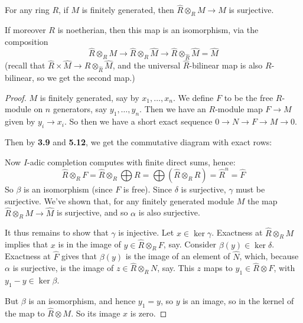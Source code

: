\documentclass[10pt,a4paper]{article}
\begin{document}
\begin{proposition}
  For any ring $R$, if $M$ is finitely generated, then $\hat{R}\otimes_R M \to \hat{M}$ is surjective.

  If moreover $R$ is noetherian, then this map is an isomorphism, via the composition
  \[\hat{R}\otimes_R M \to \hat{R}\otimes_R\hat{M} \to \hat{R}\otimes_{\hat{R}} \hat{M} = \hat{M}\]
  (recall that $\hat{R} \times \hat{M} \to \hat{R}\otimes_{\hat{R}}\hat{M}$, and the universal $\hat{R}$-bilinear map is also $R$-bilinear, so we get the second map.)
\end{proposition}
\begin{proof}
  $M$ is finitely generated, say by $x_1, \ldots, x_n$. We define $F$ to be the free $R$-module on $n$ generators, say $y_1, \ldots, y_n$. Then we have an $R$-module map $F \to M$ given by $y_i \to x_i$. So then we have a short exact sequence $0 \to N \to F \to M \to 0$.

  Then by \textbf{3.9} and \textbf{5.12}, we get the commutative diagram with exact rows:
  \begin{center}
  \end{center}
  Now $I$-adic completion computes with finite direct sums, hence:
  \[\hat{R} \otimes_R F = \hat{R} \otimes_R \bigoplus R = \bigoplus (\hat{R} \otimes_R R) = \hat{R}^n = \hat{F}\]
  So $\beta$ is an isomorphism (since $F$ is free). Since $\delta$ is surjective, $\gamma$ must be surjective. We've shown that, for any finitely generated module $M$ the map $\hat{R}\otimes_R M \to \hat{M}$ is surjective, and so $\alpha$ is also surjective.

  It thus remains to show that $\gamma$ is injective. Let $x \in \ker \gamma$. Exactness at $\hat{R}\otimes_R M$ implies that $x$ is in the image of $y \in \hat{R}\otimes_R F$, say. Consider $\beta(y) \in \ker\delta$. Exactness at $\hat{F}$ gives that $\beta(y)$ is the image of an element of $\hat{N}$, which, because $\alpha$ is surjective, is the image of $z \in \hat{R}\otimes_R N$, say. This $z$ maps to $y_1 \in \hat{R}\otimes F$, with $y_1-y \in \ker\beta$.

  But $\beta$ is an isomorphism, and hence $y_1=y$, so $y$ is an image, so in the kernel of the map to $\hat{R} \otimes M$. So its image $x$ is zero.
\end{proof}
\end{document}
